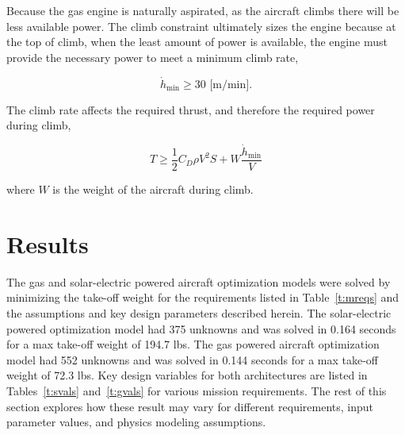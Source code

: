 Because the gas engine is naturally aspirated, as the aircraft climbs there will be less available power.  
The climb constraint ultimately sizes the engine because at the top of climb, when the least amount of power is available, the engine must provide the necessary power to meet a minimum climb rate, 

\begin{equation}
    \label{e:climbrate}
    \dot{h}_{\text{min}} \geq 30 \text{ [m/min]}.
\end{equation}

The climb rate affects the required thrust, and therefore the required power during climb, 

\begin{equation}
    \label{e:climb}
    T \geq \frac{1}{2} C_D \rho V^2 S + W \frac{\dot{h}_{\text{min}}}{V}
\end{equation}

where $W$ is the weight of the aircraft during climb.  


\section{Results}

The gas and solar-electric powered aircraft optimization models were solved by minimizing the take-off weight for the requirements listed in Table~\ref{t:mreqs} and the assumptions and key design parameters described herein. 
The solar-electric powered optimization model had 375 unknowns and was solved in 0.164 seconds for a max take-off weight of 194.7 lbs.
The gas powered aircraft optimization model had 552 unknowns and was solved in 0.144 seconds for a max take-off weight of 72.3 lbs.  
Key design variables for both architectures are listed in Tables~\ref{t:svals} and~\ref{t:gvals} for various mission requirements. 
The rest of this section explores how these result may vary for different requirements, input parameter values, and physics modeling assumptions. 

